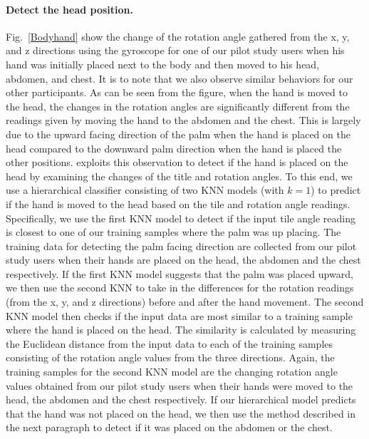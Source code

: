 \paragraph{Detect the head position.}
Fig.~\ref{Bodyhand} show the change of the rotation angle gathered from the x, y, and z directions using the gyroscope for one of our pilot
study users when his hand was initially placed next to the body and then moved to his head, abdomen, and chest. It is to note that we also
observe similar behaviors for our other participants. As can be seen from the figure, when the hand is moved to the head, the changes in
the rotation angles are significantly different from the readings given by moving the hand to the abdomen and the chest. This is largely
due to the upward facing direction of the palm when the hand is placed on the head compared to the downward palm direction when the hand is
placed the other positions. \systemname exploits this observation to detect if the hand is placed on the head by examining the changes of
the title and rotation angles. To this end, we use a hierarchical classifier consisting of two KNN models (with $k=1$) to predict if the
hand is moved to the head based on the tile and rotation angle readings. Specifically, we use the first KNN model to detect if the input
tile angle reading is closest to one of our training samples where the palm was up placing. The training data for detecting the palm facing
direction are collected from our pilot study users when their hands are placed on the head, the abdomen and the chest respectively. If the
first KNN model suggests that the palm was placed upward, we then use the second KNN to take in the differences for the rotation readings
(from the x, y, and z directions) before and after the hand movement. The second KNN model then checks if the input data are most similar
to a training sample where the hand is placed on the head. The similarity is calculated by measuring the Euclidean distance from the input
data to each of the training samples consisting of the rotation angle values from the three directions. Again, the training samples for the
second KNN model are the changing rotation angle values obtained from our pilot study users when their hands were moved to the head, the
abdomen and the chest respectively. If our hierarchical model predicts that the hand was not placed on the head, we then use the method
described in the next paragraph to detect if it was placed on the abdomen or the chest.

